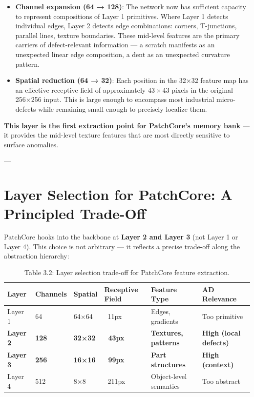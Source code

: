 \documentclass[12pt,a4paper,oneside]{report}
\begin{document}
\begin{itemize}
  \item \textbf{Channel expansion (64 → 128)}: The network now has sufficient capacity to represent compositions of Layer 1 primitives. Where Layer 1 detects individual edges, Layer 2 detects edge combinations: corners, T-junctions, parallel lines, texture boundaries. These mid-level features are the primary carriers of defect-relevant information --- a scratch manifests as an unexpected linear edge composition, a dent as an unexpected curvature pattern.
\end{itemize}
\begin{itemize}
  \item \textbf{Spatial reduction (64 → 32)}: Each position in the 32×32 feature map has an effective receptive field of approximately $43 \times 43$ pixels in the original 256×256 input. This is large enough to encompass most industrial micro-defects while remaining small enough to precisely localize them.
\end{itemize}
\textbf{This layer is the first extraction point for PatchCore's memory bank} --- it provides the mid-level texture features that are most directly sensitive to surface anomalies.

---

\section{Layer Selection for PatchCore: A Principled Trade-Off}

PatchCore hooks into the backbone at \textbf{Layer 2 and Layer 3} (not Layer 1 or Layer 4). This choice is not arbitrary --- it reflects a precise trade-off along the abstraction hierarchy:

\begin{longtable}{llllll}
\caption{Table 3.2: Layer selection trade-off for PatchCore feature extraction.} \\
\toprule
Layer & Channels & Spatial & Receptive Field & Feature Type & AD Relevance \\
\midrule
\endhead
Layer 1 & 64 & 64×64 & ~11px & Edges, gradients & Too primitive \\
\textbf{Layer 2} & \textbf{128} & \textbf{32×32} & \textbf{~43px} & \textbf{Textures, patterns} & \textbf{High (local defects)} \\
\textbf{Layer 3} & \textbf{256} & \textbf{16×16} & \textbf{~99px} & \textbf{Part structures} & \textbf{High (context)} \\
Layer 4 & 512 & 8×8 & ~211px & Object-level semantics & Too abstract \\
\bottomrule
\end{longtable}
\end{document}
